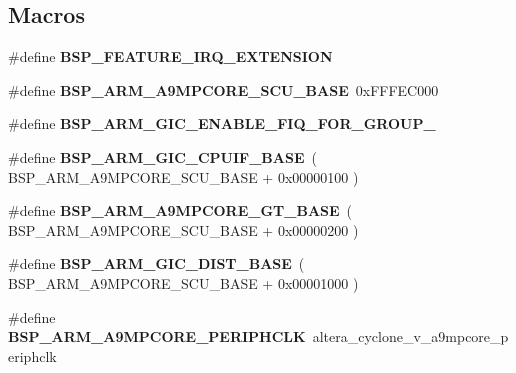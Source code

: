 \subsection*{Macros}
\begin{DoxyCompactItemize}
\item 
\mbox{\label{group__RTEMSBSPsARMCycV_ga5d7d631d3a14b7554160f14eb42f351b}} 
\#define {\bfseries B\+S\+P\+\_\+\+F\+E\+A\+T\+U\+R\+E\+\_\+\+I\+R\+Q\+\_\+\+E\+X\+T\+E\+N\+S\+I\+ON}
\item 
\mbox{\label{group__RTEMSBSPsARMCycV_ga180004170c65ed2eaa91050be70aa480}} 
\#define {\bfseries B\+S\+P\+\_\+\+A\+R\+M\+\_\+\+A9\+M\+P\+C\+O\+R\+E\+\_\+\+S\+C\+U\+\_\+\+B\+A\+SE}~0x\+F\+F\+F\+E\+C000
\item 
\mbox{\label{group__RTEMSBSPsARMCycV_gab5958bcdefb4953cea3e15afe2a084f7}} 
\#define {\bfseries B\+S\+P\+\_\+\+A\+R\+M\+\_\+\+G\+I\+C\+\_\+\+E\+N\+A\+B\+L\+E\+\_\+\+F\+I\+Q\+\_\+\+F\+O\+R\+\_\+\+G\+R\+O\+U\+P\+\_}
\item 
\mbox{\label{group__RTEMSBSPsARMCycV_ga82979270e5d617859b19ad1830434bb6}} 
\#define {\bfseries B\+S\+P\+\_\+\+A\+R\+M\+\_\+\+G\+I\+C\+\_\+\+C\+P\+U\+I\+F\+\_\+\+B\+A\+SE}~( B\+S\+P\+\_\+\+A\+R\+M\+\_\+\+A9\+M\+P\+C\+O\+R\+E\+\_\+\+S\+C\+U\+\_\+\+B\+A\+SE + 0x00000100 )
\item 
\mbox{\label{group__RTEMSBSPsARMCycV_gafdfd032028e40b1b0e2fcdbcebf24250}} 
\#define {\bfseries B\+S\+P\+\_\+\+A\+R\+M\+\_\+\+A9\+M\+P\+C\+O\+R\+E\+\_\+\+G\+T\+\_\+\+B\+A\+SE}~( B\+S\+P\+\_\+\+A\+R\+M\+\_\+\+A9\+M\+P\+C\+O\+R\+E\+\_\+\+S\+C\+U\+\_\+\+B\+A\+SE + 0x00000200 )
\item 
\mbox{\label{group__RTEMSBSPsARMCycV_ga74b3234f20bb7c846a4b35c68bbb0703}} 
\#define {\bfseries B\+S\+P\+\_\+\+A\+R\+M\+\_\+\+G\+I\+C\+\_\+\+D\+I\+S\+T\+\_\+\+B\+A\+SE}~( B\+S\+P\+\_\+\+A\+R\+M\+\_\+\+A9\+M\+P\+C\+O\+R\+E\+\_\+\+S\+C\+U\+\_\+\+B\+A\+SE + 0x00001000 )
\item 
\mbox{\label{group__RTEMSBSPsARMCycV_ga405efe98821abf1f4f4ffe6349d49c55}} 
\#define {\bfseries B\+S\+P\+\_\+\+A\+R\+M\+\_\+\+A9\+M\+P\+C\+O\+R\+E\+\_\+\+P\+E\+R\+I\+P\+H\+C\+LK}~altera\+\_\+cyclone\+\_\+v\+\_\+a9mpcore\+\_\+periphclk

\end{DoxyCompactItemize}
